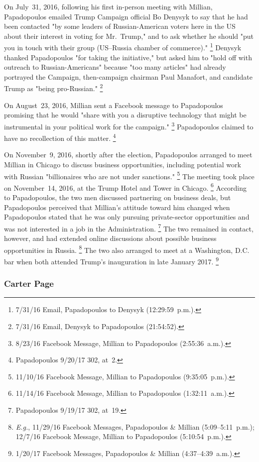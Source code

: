 On July~31, 2016, following his first in-person meeting with Millian, Papadopoulos emailed Trump Campaign official Bo Denysyk to say that he had been contacted "by some leaders of Russian-American voters here in the US about their interest in voting for Mr.~Trump," and to ask whether he should "put you in touch with their group (US--Russia chamber of commerce)."%
\footnote{7/31/16 Email, Papadopoulos to Denysyk (12:29:59~p.m.).}
Denysyk thanked Papadopoulos "for taking the initiative," but asked him to "hold off with outreach to Russian-Americans" because "too many articles" had already portrayed the Campaign, then-campaign chairman Paul Manafort, and candidate Trump as "being pro-Russian."%
\footnote{7/31/16 Email, Denysyk to Papadopoulos (21:54:52).}

On August~23, 2016, Millian sent a Facebook message to Papadopoulos promising that he would "share with you a disruptive technology that might be instrumental in your political work for the campaign."%
\footnote{8/23/16 Facebook Message, Millian to Papadopoulos (2:55:36~a.m.).}
Papadopoulos claimed to have no recollection of this matter.%
\footnote{Papadopoulos 9/20/17 302, at~2.}

On November~9, 2016, shortly after the election, Papadopoulos arranged to meet Millian in Chicago to discuss business opportunities, including potential work with Russian "billionaires who are not under sanctions."%
\footnote{11/10/16 Facebook Message, Millian to Papadopoulos (9:35:05~p.m.).}
The meeting took place on November~14, 2016, at the Trump Hotel and Tower in Chicago.%
\footnote{11/14/16 Facebook Message, Millian to Papadopoulos (1:32:11~a.m.).}
According to Papadopoulos, the two men discussed partnering on business deals, but Papadopoulos perceived that Millian's attitude toward him changed when Papadopoulos stated that he was only pursuing private-sector opportunities and was not interested in a job in the Administration.%
\footnote{Papadopoulos 9/19/17 302, at~19.}
The two remained in contact, however, and had extended online discussions about possible business opportunities in Russia.%
\footnote{\textit{E.g.}, 11/29/16 Facebook Messages, Papadopoulos \& Millian (5:09--5:11~p.m.);
12/7/16 Facebook Message, Millian to Papadopoulos (5:10:54~p.m.).}
The two also arranged to meet at a Washington, D.C. bar when both attended Trump's inauguration in late January 2017.%
\footnote{1/20/17 Facebook Messages, Papadopoulos \& Millian (4:37--4:39~a.m.).}

\subsubsection{Carter Page}

